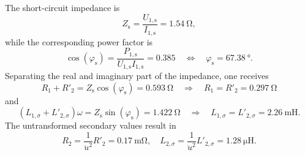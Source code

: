 \begin{solutionblock}
    The short-circuit impedance is
    $$
    Z_\mathrm{s} = \frac{U_{\mathrm{1,s}}}{I_{\mathrm{1,s}}} = \SI{1.54}{\ohm},
    $$
    while the corresponding power factor is
    $$
    \cos(\varphi_\mathrm{s}) = \frac{P_{\mathrm{1,s}}}{U_{\mathrm{1,s}}I_{\mathrm{1,s}}} = 0.385 \quad \Leftrightarrow \quad \varphi_\mathrm{s} = \SI{67.38}{\degree}.
    $$
    Separating the real and imaginary part of the impedance, one receives
    $$
    R_1 + R'_2 = Z_\mathrm{s}\cos(\varphi_\mathrm{s}) = \SI{0.593}{\ohm} \quad \Longrightarrow \quad R_1 = R'_2 =  \SI{0.297}{\ohm}
    $$
    and
    $$
    (L_{1,\sigma} + L'_{2,\sigma})\omega = Z_\mathrm{s}\sin(\varphi_\mathrm{s}) = \SI{1.422}{\ohm} \quad \Longrightarrow \quad L_{1,\sigma} = L'_{2,\sigma} =  \SI{2.26}{\milli\henry}.
    $$
    The untransformed secondary values result in
    $$
    R_2 = \frac{1}{\ddot{u}^2} R'_2 = \SI{0.17}{\milli\ohm}, \quad L_{2,\sigma} = \frac{1}{\ddot{u}^2} L'_{2,\sigma} = \SI{1.28}{\micro\henry}.
    $$
\end{solutionblock}
